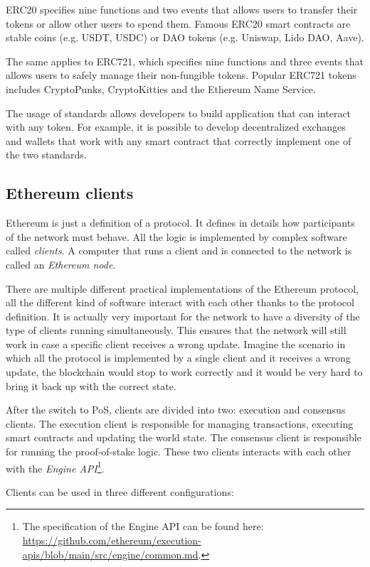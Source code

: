 ERC20 specifies nine functions and two events that allows users to transfer their tokens or allow other users to spend them. Famous ERC20 smart contracts are stable coins (e.g. USDT, USDC) or DAO tokens (e.g. Uniswap, Lido DAO, Aave).

The same applies to ERC721, which specifies nine functions and three events that allows users to safely manage their non-fungible tokens. Popular ERC721 tokens includes CryptoPunks, CryptoKitties and the Ethereum Name Service.

The usage of standards allows developers to build application that can interact with any token. For example, it is possible to develop decentralized exchanges and wallets that work with any smart contract that correctly implement one of the two standards.


\subsection{Ethereum clients}

Ethereum is just a definition of a protocol. It defines in details how participants of the network must behave. All the logic is implemented by complex software called \textit{clients}. A computer that runs a client and is connected to the network is called an \textit{Ethereum node}.

There are multiple different practical implementations of the Ethereum protocol, all the different kind of software interact with each other thanks to the protocol definition. It is actually very important for the network to have a diversity of the type of clients running simultaneously. This ensures that the network will still work in case a specific client receives a wrong update. Imagine the scenario in which all the protocol is implemented by a single client and it receives a wrong update, the blockchain would stop to work correctly and it would be very hard to bring it back up with the correct state.

After the switch to PoS, clients are divided into two: execution and consensus clients. The execution client is responsible for managing transactions, executing smart contracts and updating the world state. The consensus client is responsible for running the proof-of-stake logic. These two clients interacts with each other with the \textit{Engine API}\footnote{The specification of the Engine API can be found here: \url{https://github.com/ethereum/execution-apis/blob/main/src/engine/common.md}.}.

Clients can be used in three different configurations:

